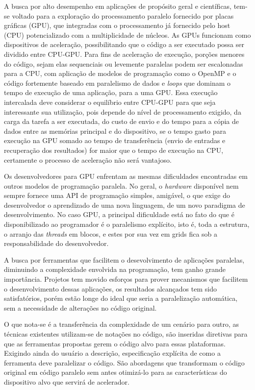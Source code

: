 A busca por alto desempenho em aplicações de propósito geral e científicas, tem-se voltado para a exploração do processamento paralelo fornecido por placas gráficas (GPU), que integradas com o processamento já fornecido pelo host (CPU) potencializado com a multiplicidade de núcleos. As GPUs funcionam como dispositivos de aceleração, possibilitando que o código a ser executado possa ser dividido entre CPU-GPU. Para fins de aceleração de execução, porções menores do código, sejam elas sequenciais ou levemente paralelas podem ser escalonadas para a CPU, com aplicação de modelos de programação como o OpenMP \cite{Openmp:site} \cite{Chapman:2007} e o código fortemente baseado em paralelismo de dados e \textit{loops} que dominam o tempo de execução de uma aplicação, para a uma GPU. Essa execução intercalada deve considerar o equilíbrio entre CPU-GPU para que seja interessante sua utilização, pois depende do nível de processamento exigido, da carga da tarefa a ser executada, do custo de envio e do tempo para a cópia de dados entre as memórias principal e do dispositivo, se o tempo gasto para execução na GPU somado ao tempo de transferência (envio de entradas e recuperação dos resultados) for maior que o tempo de execução na CPU, certamente o processo de aceleração não será vantajoso.

Os desenvolvedores para GPU enfrentam as mesmas dificuldades encontradas em outros modelos de programação paralela. No geral, o \textit{hardware} disponível nem sempre fornece uma API de programação simples, amigável, o que exige do desenvolvedor o aprendizado de uma nova linguagem, de um novo paradigma de desenvolvimento. No caso GPU, a principal dificuldade está no fato do que é disponibilizado ao programador é o paralelismo explícito, isto é, toda a estrutura, o arranjo das \textit{threads} em blocos, e estes por sua vez em grids fica sob a responsabilidade do desenvolvedor.

A busca por ferramentas que facilitem o desevolvimento de aplicações paralelas, diminuindo a complexidade envolvida na programação, tem ganho grande importância. Projetos tem movido esforços para prover mecanismos que facilitem o desenvolvimento dessas aplicações, os resultados alcançados tem sido satisfatórios, porém estão longe do ideal que seria a paralelização automática, sem a necessidade de alterações no código original.

O que nota-se é a transferência da complexidade de um cenário para outro, as técnicas existentes utilizam-se de notações no código, são inseridas diretivas para que as ferramentas propostas gerem o código alvo para essas plataformas. Exigindo ainda do usuário a descrição, especificação explícita de como a ferramenta deve paralelizar o código. São abordagens que transformam o código original em código paralelo sem antes otimizá-lo para as características do dispositivo alvo que servirá de acelerador.

